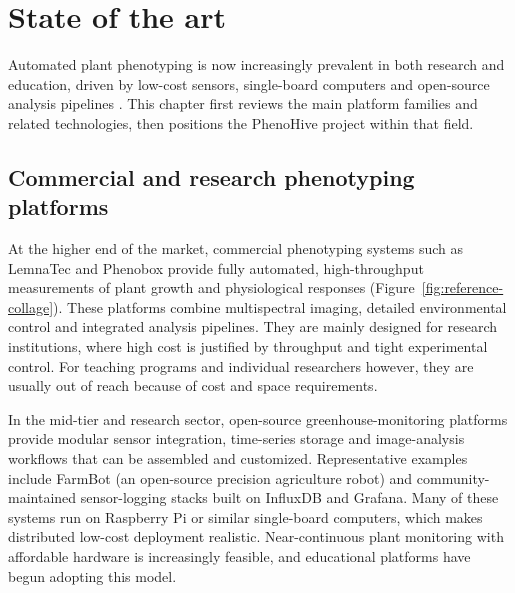 ﻿\chapter{State of the art}
\label{ch:state-of-art}

Automated plant phenotyping is now increasingly prevalent in both research and education, driven by low-cost sensors, single-board computers and open-source analysis pipelines \parencite{pieruschka2019phenotyping}. This chapter first reviews the main platform families and related technologies, then positions the PhenoHive project within that field.

\section{Commercial and research phenotyping platforms}

At the higher end of the market, commercial phenotyping systems such as LemnaTec and Phenobox provide fully automated, high-throughput measurements of plant growth and physiological responses (Figure~\ref{fig:reference-collage}). These platforms combine multispectral imaging, detailed environmental control and integrated analysis pipelines. They are mainly designed for research institutions, where high cost is justified by throughput and tight experimental control. For teaching programs and individual researchers however, they are usually out of reach because of cost and space requirements.

In the mid-tier and research sector, open-source greenhouse-monitoring platforms provide modular sensor integration, time-series storage and image-analysis workflows that can be assembled and customized. Representative examples include FarmBot \parencite{farmbot} (an open-source precision agriculture robot) and community-maintained sensor-logging stacks built on InfluxDB and Grafana. Many of these systems run on Raspberry Pi or similar single-board computers, which makes distributed low-cost deployment realistic. Near-continuous plant monitoring with affordable hardware is increasingly feasible, and educational platforms have begun adopting this model.

